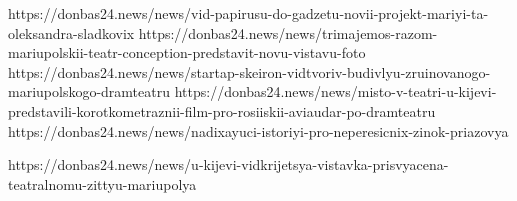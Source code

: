  
 
 
 
 


https://donbas24.news/news/vid-papirusu-do-gadzetu-novii-projekt-mariyi-ta-oleksandra-sladkovix
https://donbas24.news/news/trimajemos-razom-mariupolskii-teatr-conception-predstavit-novu-vistavu-foto
https://donbas24.news/news/startap-skeiron-vidtvoriv-budivlyu-zruinovanogo-mariupolskogo-dramteatru
https://donbas24.news/news/misto-v-teatri-u-kijevi-predstavili-korotkometraznii-film-pro-rosiiskii-aviaudar-po-dramteatru
https://donbas24.news/news/nadixayuci-istoriyi-pro-neperesicnix-zinok-priazovya

https://donbas24.news/news/u-kijevi-vidkrijetsya-vistavka-prisvyacena-teatralnomu-zittyu-mariupolya
